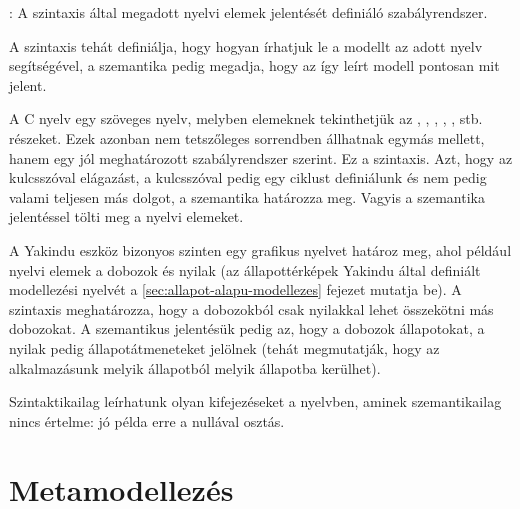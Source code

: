 \begin{definicio}
	: A szintaxis által megadott nyelvi elemek jelentését definiáló szabályrendszer.
\end{definicio}


A szintaxis tehát definiálja, hogy hogyan írhatjuk le a modellt az adott nyelv segítségével, a szemantika pedig megadja, hogy az így leírt modell pontosan mit jelent.

\begin{pelda}
	A C nyelv egy szöveges nyelv, melyben elemeknek tekinthetjük az , , , , ,  stb. részeket. Ezek azonban nem tetszőleges sorrendben állhatnak egymás mellett, hanem egy jól meghatározott szabályrendszer szerint. Ez a szintaxis. Azt, hogy az  kulcsszóval elágazást, a  kulcsszóval pedig egy ciklust definiálunk és nem pedig valami teljesen más dolgot, a szemantika határozza meg. Vagyis a szemantika jelentéssel tölti meg a nyelvi elemeket.

	A Yakindu eszköz bizonyos szinten egy grafikus nyelvet határoz meg, ahol például nyelvi elemek a dobozok és nyilak (az állapottérképek Yakindu által definiált modellezési nyelvét a \ref{sec:allapot-alapu-modellezes} fejezet mutatja be). A szintaxis meghatározza, hogy a dobozokból csak nyilakkal lehet összekötni más dobozokat. A szemantikus jelentésük pedig az, hogy a dobozok állapotokat, a nyilak pedig állapotátmeneteket jelölnek (tehát megmutatják, hogy az alkalmazásunk melyik állapotból melyik állapotba kerülhet).
\end{pelda}

\begin{megjegyzes}
	Szintaktikailag leírhatunk olyan kifejezéseket a nyelvben, aminek szemantikailag nincs értelme: jó példa erre a nullával osztás.
\end{megjegyzes}


\section{Metamodellezés}

